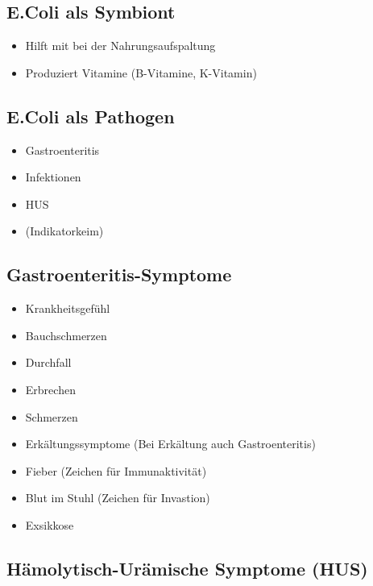 \documentclass[
]{article}
\providecommand{\tightlist}{%
  \setlength{\itemsep}{0pt}\setlength{\parskip}{0pt}}
\begin{document}
\hypertarget{e.coli-als-symbiont}{%
\subsection{E.Coli als Symbiont}\label{e.coli-als-symbiont}}

\begin{itemize}
\tightlist
\item
  Hilft mit bei der Nahrungsaufspaltung
\item
  Produziert Vitamine (B-Vitamine, K-Vitamin)
\end{itemize}

\hypertarget{e.coli-als-pathogen}{%
\subsection{E.Coli als Pathogen}\label{e.coli-als-pathogen}}

\begin{itemize}
\tightlist
\item
  Gastroenteritis
\item
  Infektionen
\item
  HUS
\item
  (Indikatorkeim)
\end{itemize}

\hypertarget{gastroenteritis-symptome}{%
\subsection{Gastroenteritis-Symptome}\label{gastroenteritis-symptome}}

\begin{itemize}
\tightlist
\item
  Krankheitsgefühl
\item
  Bauchschmerzen
\item
  Durchfall
\item
  Erbrechen
\item
  Schmerzen
\item
  Erkältungssymptome (Bei Erkältung auch Gastroenteritis)
\item
  Fieber (Zeichen für Immunaktivität)
\item
  Blut im Stuhl (Zeichen für Invastion)
\item
  Exsikkose
\end{itemize}

\hypertarget{huxe4molytisch-uruxe4mische-symptome-hus}{%
\subsection{Hämolytisch-Urämische Symptome
(HUS)}\label{huxe4molytisch-uruxe4mische-symptome-hus}}
\end{document}

